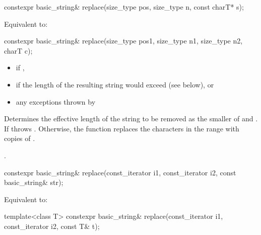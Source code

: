 %
\begin{itemdecl}
constexpr basic_string& replace(size_type pos, size_type n, const charT* s);
\end{itemdecl}

\begin{itemdescr}
\pnum
\effects
Equivalent to: 
\end{itemdescr}

%
\begin{itemdecl}
constexpr basic_string& replace(size_type pos1, size_type n1, size_type n2, charT c);
\end{itemdecl}

\begin{itemdescr}
\pnum
\throws
\begin{itemize}
\item {} if ,
\item {} if the length of the resulting string
would exceed  (see below), or
\item any exceptions thrown by 
\end{itemize}

\pnum
\effects
Determines the effective length  of the string to be
removed as the smaller of  and . If
  throws . Otherwise,
the function replaces the characters in the range
with  copies of .

\pnum
\returns
{}.
\end{itemdescr}

%
\begin{itemdecl}
constexpr basic_string& replace(const_iterator i1, const_iterator i2, const basic_string& str);
\end{itemdecl}

\begin{itemdescr}
\pnum
\effects
Equivalent to: 
\end{itemdescr}

%
\begin{itemdecl}
template<class T>
  constexpr basic_string& replace(const_iterator i1, const_iterator i2, const T& t);
\end{itemdecl}

